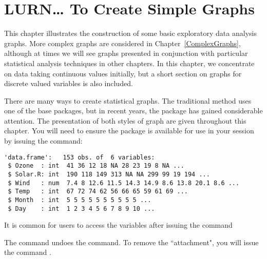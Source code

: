 

\chapter{LURN\ldots{} To Create Simple Graphs} 
\label{SimpleGraphs} 
 
 
 


This chapter illustrates the construction of some basic exploratory data analysis graphs. More complex graphs are considered in Chapter~\ref{ComplexGraphs}, although at times we will see graphs presented in conjunction with particular statistical analysis techniques in other chapters. In this chapter, we concentrate on data taking continuous values initially, but a short section on graphs for discrete valued variables is also included. 

There are many ways to create statistical graphs. The traditional method uses one of the base \R{} packages, but in recent years, the  package has gained considerable attention. The presentation of both styles of graph are given throughout this chapter. You will need to ensure the  package is available for use in your \R{} session by issuing the command:
\begin{knitrout}
\color{fgcolor}\begin{kframe}
\begin{alltt}
\hlstd{> }
\end{alltt}
\begin{verbatim}
'data.frame':	153 obs. of  6 variables:
 $ Ozone  : int  41 36 12 18 NA 28 23 19 8 NA ...
 $ Solar.R: int  190 118 149 313 NA NA 299 99 19 194 ...
 $ Wind   : num  7.4 8 12.6 11.5 14.3 14.9 8.6 13.8 20.1 8.6 ...
 $ Temp   : int  67 72 74 62 56 66 65 59 61 69 ...
 $ Month  : int  5 5 5 5 5 5 5 5 5 5 ...
 $ Day    : int  1 2 3 4 5 6 7 8 9 10 ...
\end{verbatim}
\end{kframe}
\end{knitrout}
It is common for \R{} users to access the variables after issuing the command 
\begin{knitrout}
\color{fgcolor}\begin{kframe}
\begin{alltt}
\hlstd{> }
\end{alltt}
\end{kframe}
\end{knitrout}
The  command undoes the  command. To remove the ``attachment", you will issue the command . 
 
